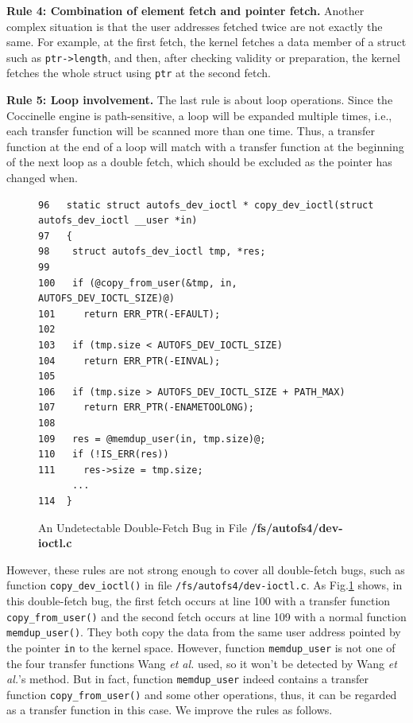 \documentclass[10pt]{llncs}
\begin{document}
\textbf{Rule 4: Combination of element fetch and pointer fetch.}
Another complex situation is that the user addresses fetched twice are not exactly the same. For example, at the first fetch, the kernel fetches a data member of a struct such as \verb:ptr->length:, and then, after checking validity or preparation, the kernel fetches the whole struct using \verb:ptr: at the second fetch.

\textbf{Rule 5: Loop involvement.}
The last rule is about loop operations. Since the Coccinelle engine is path-sensitive, 
a loop will be expanded multiple times, i.e., each transfer function will be scanned 
more than one time. Thus, a transfer function at the end of a loop will match with a transfer function at the beginning of the next loop as a double fetch, which should be excluded as the pointer has changed when.




\begin{figure}[t]
  \centering
\begin{lstlisting}[style=code]
96   static struct autofs_dev_ioctl * copy_dev_ioctl(struct autofs_dev_ioctl __user *in)
97   {
98    struct autofs_dev_ioctl tmp, *res;
99   
100   if (@copy_from_user(&tmp, in, AUTOFS_DEV_IOCTL_SIZE)@)
101     return ERR_PTR(-EFAULT);
102  
103   if (tmp.size < AUTOFS_DEV_IOCTL_SIZE)
104     return ERR_PTR(-EINVAL);
105  
106   if (tmp.size > AUTOFS_DEV_IOCTL_SIZE + PATH_MAX)
107     return ERR_PTR(-ENAMETOOLONG);
108  
109   res = @memdup_user(in, tmp.size)@;
110   if (!IS_ERR(res))
111     res->size = tmp.size;
	  ...
114  }   
\end{lstlisting}
  \caption{An Undetectable Double-Fetch Bug in File \textbf{/fs/autofs4/dev-ioctl.c}}
  \label{dev-ioctl}
\end{figure}




However, these rules are not strong enough to cover all double-fetch bugs, such as function
\verb:copy_dev_ioctl(): in file \verb:/fs/autofs4/dev-ioctl.c:. As Fig.\ref{dev-ioctl} shows, 
in this double-fetch bug, the first fetch occurs at line 100 with a transfer function \verb:copy_from_user(): and the second fetch occurs at line 109 with a normal function 
\verb:memdup_user():. They both copy the data from the same user address pointed by the 
pointer \verb:in: to the kernel space. However, function \verb:memdup_user: is not one of 
the four transfer functions Wang \textit{et al.} used, so it won't be detected by Wang 
\textit{et al.}'s method. But in fact, function \verb:memdup_user: indeed contains a 
transfer function \verb:copy_from_user(): and some other operations, thus, it can be 
regarded as a transfer function in this case. We improve the rules as follows.
\end{document}
